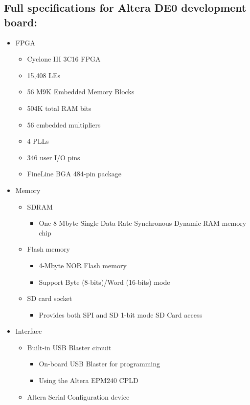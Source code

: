 \documentclass[pdftex,10.5pt]{report}
\begin{document}
\subsection{Full specifications for Altera DE0 development board:}
\begin{itemize}
\item FPGA
	\begin{itemize}
 	\item Cyclone III 3C16 FPGA
	\item 15,408 LEs
	\item 56 M9K Embedded Memory Blocks
	\item 504K total RAM bits
	\item 56 embedded multipliers
	\item 4 PLLs
	\item 346 user I/O pins
	\item FineLine BGA 484-pin package
	\end{itemize}
\item Memory
	\begin{itemize}
	\item SDRAM
		\begin{itemize}
		\item One 8-Mbyte Single Data Rate Synchronous Dynamic RAM memory chip
		\end{itemize}
	\item Flash memory
		\begin{itemize}
		\item 4-Mbyte NOR Flash memory
		\item Support Byte (8-bits)/Word (16-bits) mode
		\end{itemize}
	\item SD card socket
		\begin{itemize}
		\item Provides both SPI and SD 1-bit mode SD Card access
		\end{itemize}
	\end{itemize}
\item Interface
	\begin{itemize}
	\item Built-in USB Blaster circuit
		\begin{itemize}
	 	\item On-board USB Blaster for programming
		\item Using the Altera EPM240 CPLD
		\end{itemize}
	\item Altera Serial Configuration device
		\begin{itemize}

\end{itemize}
\end{itemize}
\end{itemize}
\end{document}
